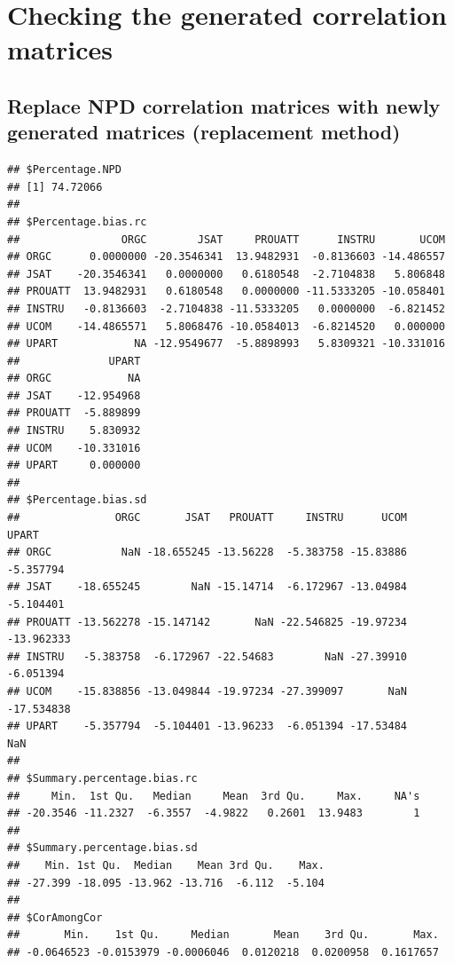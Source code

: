 \documentclass[]{article}
\newenvironment{Shaded}{\begin{snugshade}}{\end{snugshade}}
\newcommand{\KeywordTok}[1]{\textcolor[rgb]{0.13,0.29,0.53}{\textbf{#1}}}
\newcommand{\DataTypeTok}[1]{\textcolor[rgb]{0.13,0.29,0.53}{#1}}
\newcommand{\StringTok}[1]{\textcolor[rgb]{0.31,0.60,0.02}{#1}}
\newcommand{\OtherTok}[1]{\textcolor[rgb]{0.56,0.35,0.01}{#1}}
\newcommand{\OperatorTok}[1]{\textcolor[rgb]{0.81,0.36,0.00}{\textbf{#1}}}
\newcommand{\NormalTok}[1]{#1}
\begin{document}
\section{Checking the generated correlation
matrices}\label{checking-the-generated-correlation-matrices}

\subsection{Replace NPD correlation matrices with newly generated
matrices (replacement
method)}\label{replace-npd-correlation-matrices-with-newly-generated-matrices-replacement-method}

\begin{Shaded}
\end{Shaded}

\begin{verbatim}
## $Percentage.NPD
## [1] 74.72066
## 
## $Percentage.bias.rc
##                ORGC        JSAT     PROUATT      INSTRU       UCOM
## ORGC      0.0000000 -20.3546341  13.9482931  -0.8136603 -14.486557
## JSAT    -20.3546341   0.0000000   0.6180548  -2.7104838   5.806848
## PROUATT  13.9482931   0.6180548   0.0000000 -11.5333205 -10.058401
## INSTRU   -0.8136603  -2.7104838 -11.5333205   0.0000000  -6.821452
## UCOM    -14.4865571   5.8068476 -10.0584013  -6.8214520   0.000000
## UPART            NA -12.9549677  -5.8898993   5.8309321 -10.331016
##              UPART
## ORGC            NA
## JSAT    -12.954968
## PROUATT  -5.889899
## INSTRU    5.830932
## UCOM    -10.331016
## UPART     0.000000
## 
## $Percentage.bias.sd
##               ORGC       JSAT   PROUATT     INSTRU      UCOM      UPART
## ORGC           NaN -18.655245 -13.56228  -5.383758 -15.83886  -5.357794
## JSAT    -18.655245        NaN -15.14714  -6.172967 -13.04984  -5.104401
## PROUATT -13.562278 -15.147142       NaN -22.546825 -19.97234 -13.962333
## INSTRU   -5.383758  -6.172967 -22.54683        NaN -27.39910  -6.051394
## UCOM    -15.838856 -13.049844 -19.97234 -27.399097       NaN -17.534838
## UPART    -5.357794  -5.104401 -13.96233  -6.051394 -17.53484        NaN
## 
## $Summary.percentage.bias.rc
##     Min.  1st Qu.   Median     Mean  3rd Qu.     Max.     NA's 
## -20.3546 -11.2327  -6.3557  -4.9822   0.2601  13.9483        1 
## 
## $Summary.percentage.bias.sd
##    Min. 1st Qu.  Median    Mean 3rd Qu.    Max. 
## -27.399 -18.095 -13.962 -13.716  -6.112  -5.104 
## 
## $CorAmongCor
##       Min.    1st Qu.     Median       Mean    3rd Qu.       Max. 
## -0.0646523 -0.0153979 -0.0006046  0.0120218  0.0200958  0.1617657
\end{verbatim}
\end{document}
